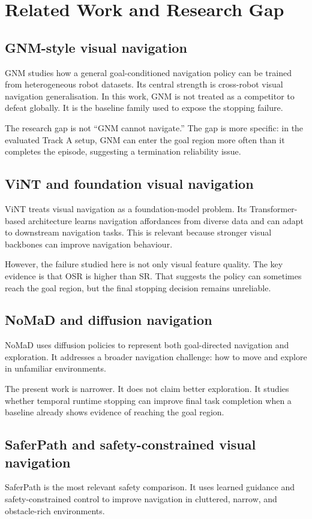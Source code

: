 \documentclass[conference]{IEEEtran}
\begin{document}
\section{Related Work and Research Gap}

\subsection{GNM-style visual navigation}
GNM studies how a general goal-conditioned navigation policy can be trained from heterogeneous robot datasets. Its central strength is cross-robot visual navigation generalisation. In this work, GNM is not treated as a competitor to defeat globally. It is the baseline family used to expose the stopping failure.

The research gap is not ``GNM cannot navigate.'' The gap is more specific: in the evaluated Track A setup, GNM can enter the goal region more often than it completes the episode, suggesting a termination reliability issue.

\subsection{ViNT and foundation visual navigation}
ViNT treats visual navigation as a foundation-model problem. Its Transformer-based architecture learns navigation affordances from diverse data and can adapt to downstream navigation tasks. This is relevant because stronger visual backbones can improve navigation behaviour.

However, the failure studied here is not only visual feature quality. The key evidence is that OSR is higher than SR. That suggests the policy can sometimes reach the goal region, but the final stopping decision remains unreliable.

\subsection{NoMaD and diffusion navigation}
NoMaD uses diffusion policies to represent both goal-directed navigation and exploration. It addresses a broader navigation challenge: how to move and explore in unfamiliar environments.

The present work is narrower. It does not claim better exploration. It studies whether temporal runtime stopping can improve final task completion when a baseline already shows evidence of reaching the goal region.

\subsection{SaferPath and safety-constrained visual navigation}
SaferPath is the most relevant safety comparison. It uses learned guidance and safety-constrained control to improve navigation in cluttered, narrow, and obstacle-rich environments.
\end{document}
